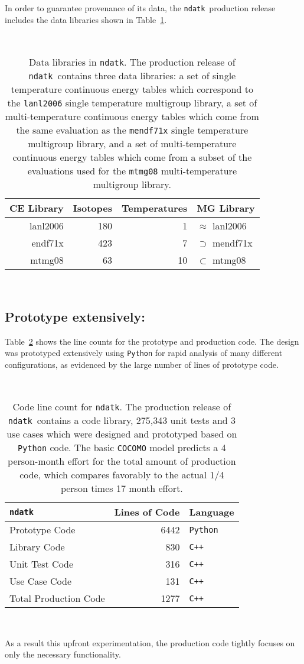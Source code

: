 \documentclass[12pt]{lamemo}
\newcommand{\ndatk}{\texttt{ndatk}}
\begin{document}
In order to guarantee provenance of its data, the \ndatk\ production
release includes the data libraries shown in Table~\ref{tbl:data}.
\begin{table}\centering
\hrulefill\\
\caption{Data libraries in \ndatk.  The production release of
  \ndatk\ contains three data libraries: a set of single temperature
  continuous energy tables which correspond to the \texttt{lanl2006}
  single temperature multigroup library, a set of multi-temperature
  continuous energy tables which come from the same evaluation as the
  \texttt{mendf71x} single temperature multigroup library, and a set
  of multi-temperature continuous energy tables which come from a
  subset of the evaluations used for the \texttt{mtmg08}
  multi-temperature multigroup library.} \label{tbl:data}
\begin{tabular}{rrr|l}\hline
CE Library & Isotopes & Temperatures & MG Library \\ \hline
lanl2006 & 180 & 1 & $\approx$ lanl2006 \\
endf71x & 423 & 7 & $\supset$ mendf71x \\
mtmg08 & 63 & 10 & $\subset$ mtmg08 \\ 
\end{tabular}\\
\hrulefill
\end{table}

\subsection{\hspace{-1.5em}Prototype extensively: }
Table~\ref{tbl:code} shows the line counts for the prototype and
production code.  The design was prototyped extensively using
\texttt{Python} for rapid analysis of many different configurations, as
evidenced by the large number of lines of prototype code.
\begin{table}\centering
\hrulefill\\
\caption{Code line count for \ndatk.  The production release of
  \ndatk\ contains a code library, 275,343 unit tests and 3 use cases
  which were designed and prototyped based on \texttt{Python} code.
  The basic \texttt{COCOMO}\cite{boehm81} model predicts a 4
  person-month effort for the total amount of production code, which
  compares favorably to the actual 1/4 person times 17 month
  effort.} \label{tbl:code}
\begin{tabular}{lr|l}\hline
\ndatk & Lines of Code & Language \\ \hline
Prototype Code & 6442 & \texttt{Python} \\ \hline
Library Code & 830 & \texttt{C++} \\
Unit Test Code & 316 & \texttt{C++} \\
Use Case Code & 131 & \texttt{C++} \\ \hline
Total Production Code & 1277 & \texttt{C++}
\end{tabular}\\
\hrulefill
\end{table}
As a result this upfront experimentation, the production code tightly
focuses on only the necessary functionality.
\end{document}
